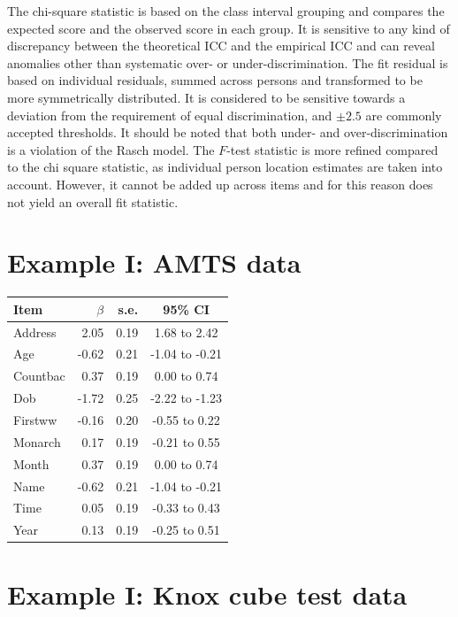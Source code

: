 \documentclass{article}
\begin{document}
The chi-square statistic is based on the class interval grouping and compares the expected score and the observed score in each group. It is sensitive to any kind of discrepancy between the theoretical ICC and the empirical ICC and can reveal anomalies other than systematic over- or under-discrimination. The fit residual is based on individual residuals, summed across persons and transformed to be more symmetrically distributed. It is considered to be sensitive towards a deviation from the requirement of equal discrimination, and $\pm2.5$ are commonly accepted thresholds. It should be noted that both under- and over-discrimination is a  violation of the Rasch model. The $F$-test statistic is more refined compared to the chi square statistic, as individual person location estimates are taken into account. However, it cannot be added up across items and for this reason does not yield an overall fit statistic.




\newpage
\section{Example I: AMTS data}




\begin{table}[b!]
\begin{tabular}{lrrc}
\hline
Item     &$\beta$&s.e.&95\% CI\\
\hline
Address  & 2.05&0.19& 1.68 to 2.42 \\
Age      &-0.62&0.21&-1.04 to -0.21 \\
Countbac & 0.37&0.19& 0.00 to 0.74 \\
Dob      &-1.72&0.25&-2.22 to -1.23 \\
Firstww  &-0.16&0.20&-0.55 to 0.22 \\
Monarch  & 0.17&0.19&-0.21 to 0.55 \\
Month    & 0.37&0.19& 0.00 to 0.74 \\
Name     &-0.62&0.21&-1.04 to -0.21 \\
Time     & 0.05&0.19&-0.33 to 0.43 \\
Year     & 0.13&0.19&-0.25 to 0.51 \\
\hline
\end{tabular}
\end{table}


\section{Example I: Knox cube test data}
\end{document}

